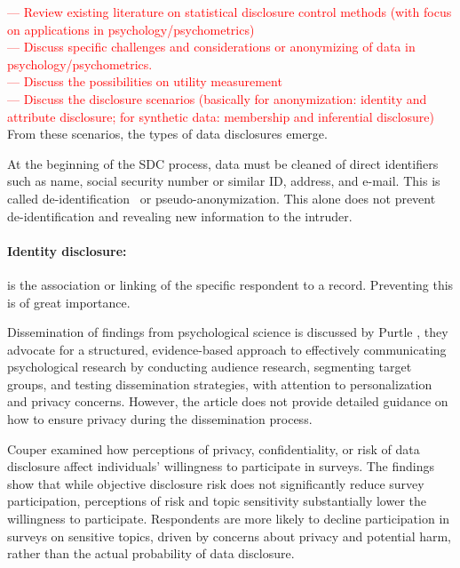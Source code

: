 \documentclass{article}
\begin{document}
\textcolor{red}{— Review existing literature on statistical disclosure control methods (with focus on applications in  psychology/psychometrics)} \\
\textcolor{red}{— Discuss specific challenges and considerations or anonymizing of data in psychology/psychometrics.} \\
\textcolor{red}{— Discuss the possibilities on utility measurement} \\
\textcolor{red}{— Discuss the disclosure scenarios (basically for anonymization: identity and attribute disclosure; for synthetic data: membership and inferential disclosure)} \\


From these scenarios, the types of data disclosures emerge.

At the beginning of the SDC process, data must be cleaned of direct identifiers such as name, social security number or similar ID, address, and e-mail. This is called de-identification~\cite{2001_Duncan} or pseudo-anonymization. This alone does not prevent de-identification and revealing new information to the intruder.





\paragraph{Identity disclosure:} is the association or linking of the specific respondent to a record. Preventing this is of great importance. 










Dissemination of findings from psychological science is discussed by Purtle \cite{2020_Purtle}, they advocate for a structured, evidence-based approach to effectively communicating psychological research by conducting audience research, segmenting target groups, and testing dissemination strategies, with attention to personalization and privacy concerns. However, the article does not provide detailed guidance on how to ensure privacy during the dissemination process.

Couper \cite{2008_Couper} examined how perceptions of privacy, confidentiality, or risk of data disclosure affect individuals' willingness to participate in surveys. The findings show that while objective disclosure risk does not significantly reduce survey participation, perceptions of risk and topic sensitivity substantially lower the willingness to participate. Respondents are more likely to decline participation in surveys on sensitive topics, driven by concerns about privacy and potential harm, rather than the actual probability of data disclosure.
\end{document}
